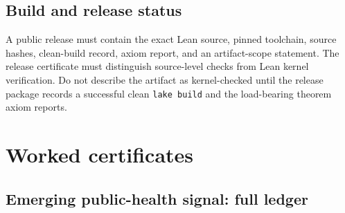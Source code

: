 \documentclass[10pt]{article}
\begin{document}
\subsection{Build and release status}

A public release must contain the exact Lean source, pinned toolchain, source hashes, clean-build record, axiom report, and an artifact-scope statement. The release certificate must distinguish source-level checks from Lean kernel verification. Do not describe the artifact as kernel-checked until the release package records a successful clean \texttt{lake build} and the load-bearing theorem axiom reports.

\section{Worked certificates}
\label{sec:worked}

\subsection{Emerging public-health signal: full ledger}
\end{document}
